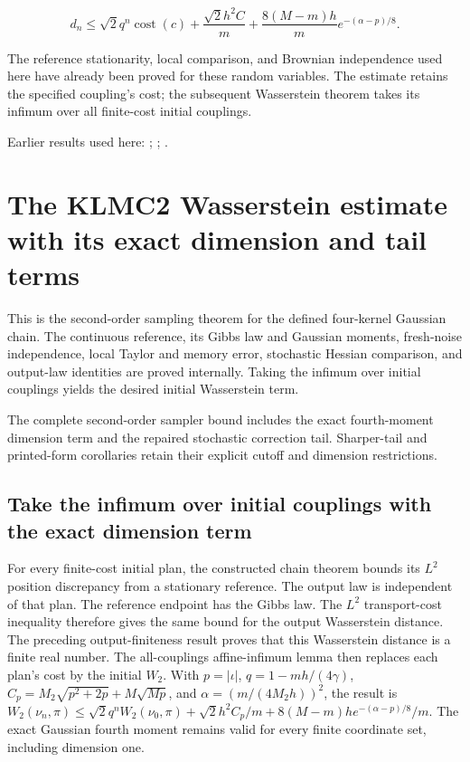 \documentclass[11pt,a4paper]{report}
\begin{document}
\[d_n\le\sqrt2q^n\operatorname{cost}(c)+\frac{\sqrt2h^2C}{m}+\frac{8(M-m)h}{m}e^{-(\alpha-p)/8}.\]

The reference stationarity, local comparison, and Brownian independence used here have already been proved for these random variables. The estimate retains the specified coupling's cost; the subsequent Wasserstein theorem takes its infimum over all finite-cost initial couplings.



Earlier results used here: \cite[Section~3.17.1]{LangevinLean2026ULASC}; \cite[Section~3.17.2]{LangevinLean2026ULASC}; \cite[Section~3.26.3]{LangevinLean2026ULASC}.
\section{\texorpdfstring{The KLMC2 Wasserstein estimate with its exact dimension and tail terms}{The KLMC2 Wasserstein estimate with its exact dimension and tail terms}}
\label{proof-module-KineticLangevin-CanonicalKLMC2-lean}


This is the second-order sampling theorem for the defined four-kernel Gaussian chain. The continuous reference, its Gibbs law and Gaussian moments, fresh-noise independence, local Taylor and memory error, stochastic Hessian comparison, and output-law identities are proved internally. Taking the infimum over initial couplings yields the desired initial Wasserstein term.



The complete second-order sampler bound includes the exact fourth-moment dimension term and the repaired stochastic correction tail. Sharper-tail and printed-form corollaries retain their explicit cutoff and dimension restrictions.

\subsection{\texorpdfstring{Take the infimum over initial couplings with the exact dimension term}{Take the infimum over initial couplings with the exact dimension term}}
\label{report-step-KineticLangevin-CanonicalKLMC2-lean-1}


For every finite-cost initial plan, the constructed chain theorem bounds its \(L^{2}\) position discrepancy from a stationary reference. The output law is independent of that plan. The reference endpoint has the Gibbs law. The \(L^{2}\) transport-cost inequality therefore gives the same bound for the output Wasserstein distance. The preceding output-finiteness result proves that this Wasserstein distance is a finite real number. The all-couplings affine-infimum lemma then replaces each plan’s cost by the initial \(W_2\). With \(p=|\iota|\), \(q=1-mh/(4\gamma)\), \(C_p=M_2\sqrt{p^2+2p}+M\sqrt{Mp}\), and \(\alpha=(m/(4M_2h))^2\), the result is \(W_2(\nu_n,\pi)\le\sqrt2q^nW_2(\nu_0,\pi)+\sqrt2h^2C_p/m+8(M-m)h e^{-(\alpha-p)/8}/m\). The exact Gaussian fourth moment remains valid for every finite coordinate set, including dimension one.
\end{document}
